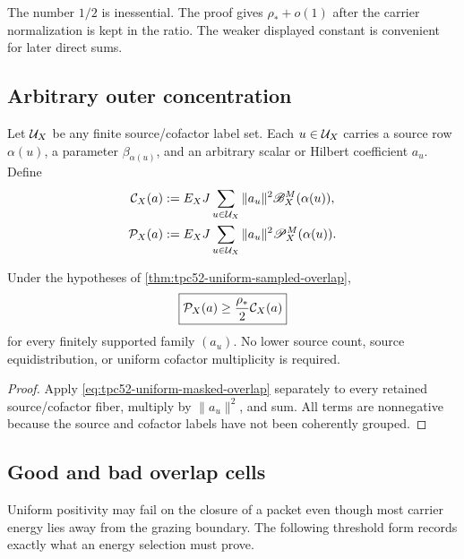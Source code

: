 The number \(1/2\) is inessential.  The proof gives
\(\rho_*+o(1)\) after the carrier normalization is kept in the ratio.  The
weaker displayed constant is convenient for later direct sums.

\subsection{Arbitrary outer concentration}

Let \(\mathcal U_X\) be any finite source/cofactor label set.  Each
\(u\in\mathcal U_X\) carries a source row \(\alpha(u)\), a parameter
\(\beta_{\alpha(u)}\), and an arbitrary scalar or Hilbert coefficient
\(a_u\).  Define
\begin{align}
 \mathcal C_X(a)&:=E_XJ\sum_{u\in\mathcal U_X}
             \|a_u\|^2\mathscr B_X^M(\alpha(u)),
 \label{eq:tpc52-outer-carrier-energy}\\
 \mathcal P_X(a)&:=E_XJ\sum_{u\in\mathcal U_X}
             \|a_u\|^2\mathscr P_X^M(\alpha(u)).
 \label{eq:tpc52-outer-profile-energy}
\end{align}

\begin{corollary}
\label{cor:tpc52-arbitrary-source-r-concentration}
Under the hypotheses of \cref{thm:tpc52-uniform-sampled-overlap},
\begin{equation}
 \boxed{\mathcal P_X(a)\ge \frac{\rho_*}{2}\mathcal C_X(a)}
 \label{eq:tpc52-outer-overlap}
\end{equation}
for every finitely supported family \((a_u)\).  No lower source count,
source equidistribution, or uniform cofactor multiplicity is required.
\end{corollary}

\begin{proof}
Apply \eqref{eq:tpc52-uniform-masked-overlap} separately to every retained
source/cofactor fiber, multiply by \(\|a_u\|^2\), and sum.  All terms are
nonnegative because the source and cofactor labels have not been coherently
grouped.
\end{proof}

\subsection{Good and bad overlap cells}

Uniform positivity may fail on the closure of a packet even though most
carrier energy lies away from the grazing boundary.  The following threshold
form records exactly what an energy selection must prove.

